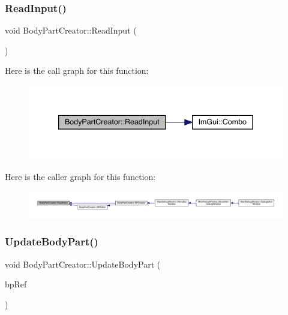 \subsubsection{\texorpdfstring{Read\+Input()}{ReadInput()}}
{\footnotesize\ttfamily void Body\+Part\+Creator\+::\+Read\+Input (\begin{DoxyParamCaption}{ }\end{DoxyParamCaption})}

Here is the call graph for this function\+:
\nopagebreak
\begin{figure}[H]
\begin{center}
\leavevmode
\includegraphics[width=339pt]{d8/d3a/namespace_body_part_creator_a7d0a8af2804bcc6a41e19b1d84013efd_cgraph}
\end{center}
\end{figure}
Here is the caller graph for this function\+:
\nopagebreak
\begin{figure}[H]
\begin{center}
\leavevmode
\includegraphics[width=350pt]{d8/d3a/namespace_body_part_creator_a7d0a8af2804bcc6a41e19b1d84013efd_icgraph}
\end{center}
\end{figure}
\mbox{\label{namespace_body_part_creator_ab6d6a7845f43f745c09aaa1514881e20}} 
\subsubsection{\texorpdfstring{Update\+Body\+Part()}{UpdateBodyPart()}}
{\footnotesize\ttfamily void Body\+Part\+Creator\+::\+Update\+Body\+Part (\begin{DoxyParamCaption}\item[{\mbox{\hyperlink{class_body_part}{Body\+Part}} \&}]{bp\+Ref }\end{DoxyParamCaption})}

